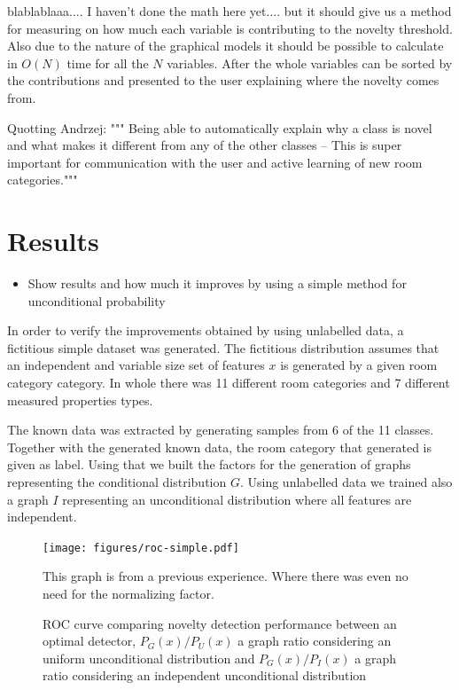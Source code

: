 \documentclass[runningheads,a4paper]{llncs}
\begin{document}
blablablaaa....
I haven't done the math here yet.... but it should give us a method for measuring on how much each variable is contributing to the novelty
threshold.
Also due to the nature of the graphical models it should be possible to calculate in $O(N)$ time for all the $N$ variables.
After the whole variables can be sorted by the contributions and presented to the user explaining where the novelty comes from.

Quotting Andrzej: """ Being able to automatically explain why a class is novel and what
makes it different from any of the other classes -- This is super important for communication with the user and active learning of new room categories."""


\section{Results}
\begin{itemize}
\item Show results and how much it improves by using a simple method for unconditional probability
\end{itemize}

In order to verify the improvements obtained by using unlabelled data, a fictitious simple dataset was generated.
The fictitious distribution assumes that an independent and variable size set of features $x$ is generated by a
given room category category. In whole there was 11 different room categories and 7 different measured properties types.

The known data was extracted by generating samples from 6 of the 11 classes. Together with the generated known data, the
room category that generated is given as label. Using that we built the factors for the generation of graphs representing
the conditional distribution $G$.
Using unlabelled data we trained also a graph $I$ representing an unconditional distribution where all features are independent.

\begin{figure}[h!]
\centering
\texttt{[image: figures/roc-simple.pdf]}

This graph is from a previous experience. Where there was even no need for the normalizing factor.

\caption{\label{fig:fictitious-roc}ROC curve comparing novelty detection performance between an optimal detector,
         $P_G(x)/P_U(x)$ a graph ratio considering an uniform unconditional distribution and
         $P_G(x)/P_I(x)$ a graph ratio considering an independent unconditional distribution}
\end{figure}
\end{document}
